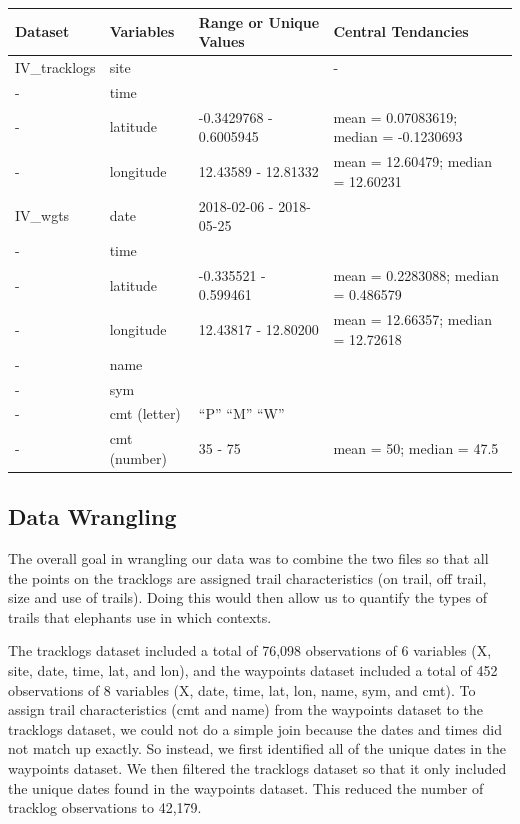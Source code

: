 \documentclass[12pt,]{article}
\begin{document}
\begin{longtable}[]{@{}llll@{}}
\toprule
\textbf{Dataset} & \textbf{Variables} & \textbf{Range or Unique Values}
& \textbf{Central Tendancies}\tabularnewline
\midrule
\endhead
IV\_tracklogs & site & & -\tabularnewline
- & time & &\tabularnewline
- & latitude & -0.3429768 - 0.6005945 & mean = 0.07083619; median =
-0.1230693\tabularnewline
- & longitude & 12.43589 - 12.81332 & mean = 12.60479; median =
12.60231\tabularnewline
IV\_wgts & date & 2018-02-06 - 2018-05-25 &\tabularnewline
- & time & &\tabularnewline
- & latitude & -0.335521 - 0.599461 & mean = 0.2283088; median =
0.486579\tabularnewline
- & longitude & 12.43817 - 12.80200 & mean = 12.66357; median =
12.72618\tabularnewline
- & name & &\tabularnewline
- & sym & &\tabularnewline
- & cmt (letter) & ``P'' ``M'' ``W'' &\tabularnewline
- & cmt (number) & 35 - 75 & mean = 50; median = 47.5\tabularnewline
\bottomrule
\end{longtable}

\hypertarget{data-wrangling}{%
\subsection{Data Wrangling}\label{data-wrangling}}

The overall goal in wrangling our data was to combine the two files so
that all the points on the tracklogs are assigned trail characteristics
(on trail, off trail, size and use of trails). Doing this would then
allow us to quantify the types of trails that elephants use in which
contexts.

The tracklogs dataset included a total of 76,098 observations of 6
variables (X, site, date, time, lat, and lon), and the waypoints dataset
included a total of 452 observations of 8 variables (X, date, time, lat,
lon, name, sym, and cmt). To assign trail characteristics (cmt and name)
from the waypoints dataset to the tracklogs dataset, we could not do a
simple join because the dates and times did not match up exactly. So
instead, we first identified all of the unique dates in the waypoints
dataset. We then filtered the tracklogs dataset so that it only included
the unique dates found in the waypoints dataset. This reduced the number
of tracklog observations to 42,179.
\end{document}
